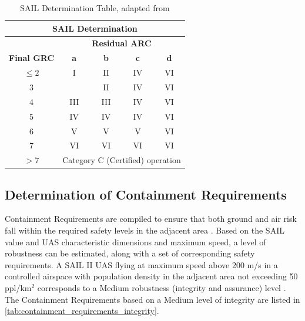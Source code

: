 \begin{table}[h]
\centering
\caption{SAIL Determination Table, adapted from \cite{Jarus_main}}
\begin{tabular}{|c|c|c|c|c|}
\hline
\multicolumn{5}{|c|}{\textbf{SAIL Determination}} \\ \hline
\multicolumn{1}{|c|}{} & \multicolumn{4}{c|}{\textbf{Residual ARC}} \\ \hline
\textbf{Final GRC} & \textbf{a} & \textbf{b} & \textbf{c} & \textbf{d} \\ \hline
$\leq 2$ & I   & II  & IV  & VI \\ \hline
3         & \cellcolor{yellow!50}{II}  & II  & IV  & VI \\ \hline
4         & III & III & IV  & VI \\ \hline
5         & IV  & IV  & IV  & VI \\ \hline
6         & V   & V   & V   & VI \\ \hline
7         & VI  & VI  & VI  & VI \\ \hline
$> 7$     & \multicolumn{4}{c|}{Category C (Certified) operation} \\ \hline
\end{tabular}
\label{tab:SAIL_determination_table}
\end{table}



\subsection{Determination of Containment Requirements}
Containment Requirements are compiled to ensure that both ground and air risk fall within the required safety levels in the adjacent area \cite{Jarus_main}. Based on the SAIL value and UAS characteristic dimensions and maximum speed, a level of robustness can be estimated, along with a set of corresponding safety requirements. A SAIL II UAS flying at maximum speed above 200 m/s in a controlled airspace with population density in the adjacent area not exceeding 50 ppl/km$^2$ corresponds to a Medium robustness (integrity and assurance) level \cite{Jarus_main}. The Containment Requirements based on a Medium level of integrity are listed in \autoref{tab:containment_requirements_integrity}.

